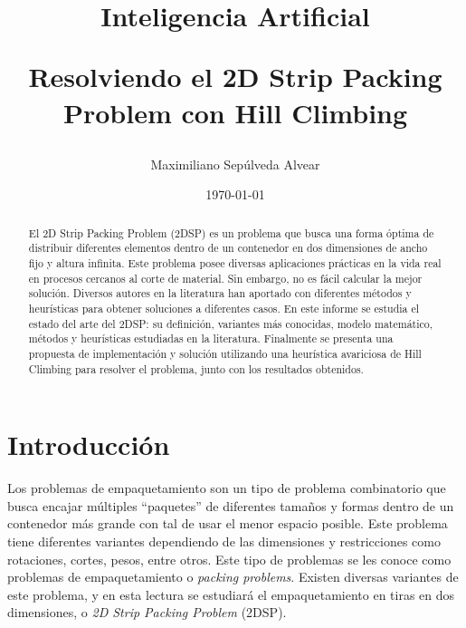 \documentclass[letter, 10pt]{article}
\begin{document}
\title{Inteligencia Artificial \\ \begin{Large}Resolviendo el 2D Strip Packing Problem con Hill Climbing\end{Large}}
\author{Maximiliano Sepúlveda Alvear}
\date{\today}
\maketitle


\vspace{2cm}


\begin{abstract}

    El 2D Strip Packing Problem (2DSP) es un problema que busca una forma óptima de distribuir diferentes elementos dentro de un contenedor en dos dimensiones de ancho fijo y altura infinita. Este problema posee diversas aplicaciones prácticas en la vida real en procesos cercanos al corte de material. Sin embargo, no es fácil calcular la mejor solución. Diversos autores en la literatura han aportado con diferentes métodos y heurísticas para obtener soluciones a diferentes casos. En este informe se estudia el estado del arte del 2DSP: su definición, variantes más conocidas, modelo matemático, métodos y heurísticas estudiadas en la literatura. Finalmente se presenta una propuesta de implementación y solución utilizando una heurística avariciosa de Hill Climbing para resolver el problema, junto con los resultados obtenidos.

\end{abstract}




\section{Introducción}

Los problemas de empaquetamiento son un tipo de problema combinatorio que busca encajar múltiples ``paquetes'' de diferentes tamaños y formas dentro de un contenedor más grande con tal de usar el menor espacio posible. Este problema tiene diferentes variantes dependiendo de las dimensiones y restricciones como rotaciones, cortes, pesos, entre otros. Este tipo de problemas se les conoce como problemas de empaquetamiento o \textit{packing problems}. Existen diversas variantes de este problema, y en esta lectura se estudiará el empaquetamiento en tiras en dos dimensiones, o \textit{2D Strip Packing Problem} (2DSP).
\end{document}

